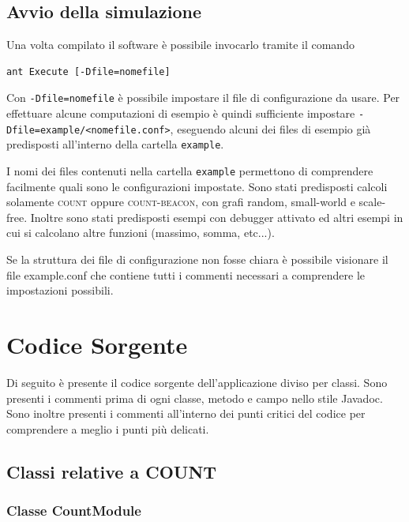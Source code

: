 \documentclass[a4paper,12pt]{article}
\begin{document}
\subsection{Avvio della simulazione}

Una volta compilato il software \`e possibile invocarlo tramite il comando
\begin{lstlisting}[basicstyle=\ttfamily]
ant Execute [-Dfile=nomefile]
\end{lstlisting}

Con \texttt{-Dfile=nomefile} \`e possibile impostare il file di configurazione da usare. Per effettuare alcune computazioni di esempio \`e quindi sufficiente impostare \texttt{-Dfile=example/<nomefile.conf>}, eseguendo alcuni dei files di esempio gi\`a predisposti all'interno della cartella \texttt{example}.

I nomi dei files contenuti nella cartella \texttt{example} permettono di comprendere facilmente quali sono le configurazioni impostate. Sono stati predisposti calcoli solamente \textsc{count} oppure \textsc{count-beacon}, con grafi random, small-world e scale-free. Inoltre sono stati predisposti esempi con debugger attivato ed altri esempi in cui si calcolano altre funzioni (massimo, somma, etc...).

Se la struttura dei file di configurazione non fosse chiara \`e possibile visionare il file \textsf{example.conf} che contiene tutti i commenti necessari a comprendere le impostazioni possibili.

\appendix
\section{Codice Sorgente}

Di seguito \`e presente il codice sorgente dell'applicazione diviso per classi. Sono presenti i commenti prima di ogni classe, metodo e campo nello stile Javadoc. Sono inoltre presenti i commenti all'interno dei punti critici del codice per comprendere a meglio i punti pi\`u delicati.

\subsection{Classi relative a COUNT}

\subsubsection{Classe \textsf{CountModule}}
\end{document}
